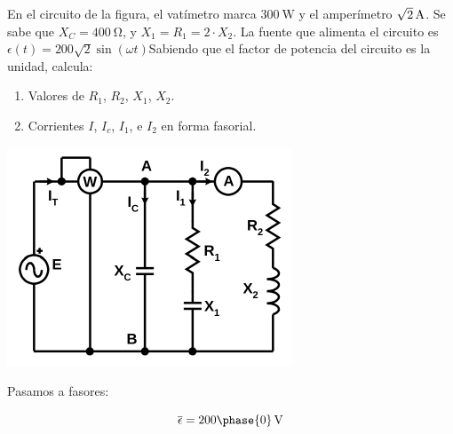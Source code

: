 \documentclass[12pt]{article}
\begin{document}




En el circuito de la figura, el vatímetro marca $\SI{300}{\watt}$ y el amperímetro $\SI[parse-numbers=false]{\sqrt{2}}{\ampere}$. Se sabe que $X_C = \SI{400}{\ohm}$, y $X_1 = R_1 = 2 \cdot X_2$. La fuente que alimenta el circuito es $\epsilon(t) = 200\sqrt{2} \sin(\omega t)$Sabiendo que el factor de potencia del circuito es la unidad, calcula:

\begin{enumerate}
\item Valores de $R_1$, $R_2$, $X_1$, $X_2$.
\item Corrientes $I$, $I_c$, $I_1$, e $I_2$ en forma fasorial. 
\end{enumerate}

\begin{center}
  \includegraphics{../figs/problema11}
\end{center}


Pasamos a fasores:

\[
  \overline{\epsilon} = \SI[parse-numbers=false]{200\phase{0}}{\volt}
\]
\end{document}
